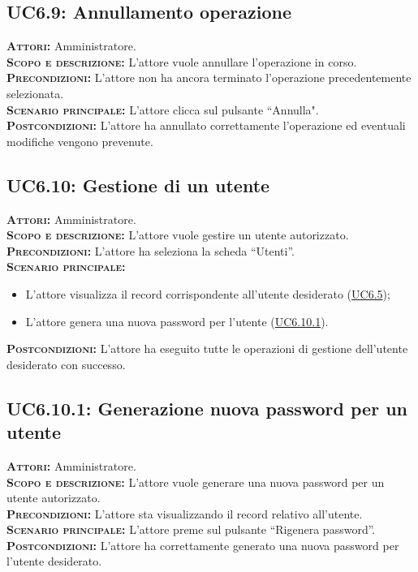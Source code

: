 \subsection{UC6.9: Annullamento operazione}
\label{sec:UC69}
\textsc{\textbf{Attori:}} Amministratore.\\
\textsc{\textbf{Scopo e descrizione:}} L'attore vuole annullare l'operazione in corso.\\
\textsc{\textsc{\textbf{Precondizioni:}}} L'attore non ha ancora terminato l'operazione precedentemente selezionata.\\
\textsc{\textbf{Scenario principale:}} L'attore clicca sul pulsante ``Annulla".\\
\textsc{\textbf{Postcondizioni:}} L'attore ha annullato correttamente l'operazione ed eventuali modifiche vengono prevenute.

\subsection{UC6.10: Gestione di un utente}
\label{sec:UC610}
\textsc{\textbf{Attori:}} Amministratore.\\
\textsc{\textbf{Scopo e descrizione:}} L'attore vuole gestire un utente autorizzato.\\
\textsc{\textsc{\textbf{Precondizioni:}}} L'attore ha seleziona la scheda ``Utenti''.\\
\textsc{\textbf{Scenario principale:}} 
\begin{itemize}
    \item L'attore visualizza il record corrispondente all'utente desiderato (\hyperref[sec:UC65]{UC6.5});
    \item L'attore genera una nuova password per l'utente (\hyperref[sec:UC6101]{UC6.10.1}).
\end{itemize}
\textsc{\textbf{Postcondizioni:}} L'attore ha eseguito tutte le operazioni di gestione dell'utente desiderato con successo.

\subsection{UC6.10.1: Generazione nuova password per un utente}
\label{sec:UC6101}
\textsc{\textbf{Attori:}} Amministratore.\\
\textsc{\textbf{Scopo e descrizione:}} L'attore vuole generare una nuova password per un utente autorizzato.\\
\textsc{\textsc{\textbf{Precondizioni:}}} L'attore sta visualizzando il record relativo all'utente.\\
\textsc{\textbf{Scenario principale:}} L'attore preme sul pulsante ``Rigenera password''.\\
\textsc{\textbf{Postcondizioni:}} L'attore ha correttamente generato una nuova password per l'utente desiderato.

